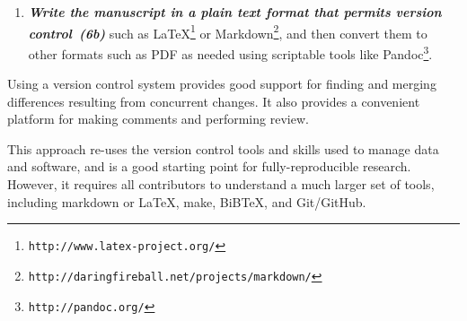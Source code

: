\documentclass[10pt,letterpaper]{article}
\newcommand{\withurl}[2]{{#1}\footnote{{\texttt{#2}}}}
\newcommand{\practice}[2]{\textbf{\emph{{#2}~({#1})}}}
\begin{document}
\begin{enumerate}

\item

  \practice{6b}{Write the manuscript in a plain text format that
  permits version control} such as
  \withurl{LaTeX}{http://www.latex-project.org/} or
  \withurl{Markdown}{http://daringfireball.net/projects/markdown/},
  and then convert them to other formats such as PDF as needed using
  scriptable tools like \withurl{Pandoc}{http://pandoc.org/}.

\end{enumerate}

Using a version control system provides good support for finding and
merging differences resulting from concurrent changes. It also
provides a convenient platform for making comments and performing
review.

This approach re-uses the version control tools and skills used to
manage data and software, and is a good starting point for
fully-reproducible research. However, it requires all contributors to
understand a much larger set of tools, including markdown or LaTeX,
make, BiBTeX, and Git/GitHub.

%
%



\end{document}
